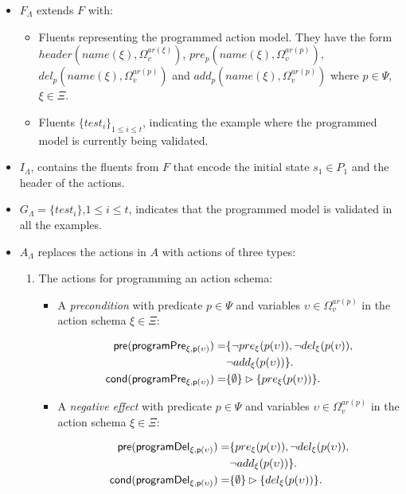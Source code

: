 \documentclass[letterpaper]{article} %
\newcommand{\pre}{\mathsf{pre}}     %
\newcommand{\cond}{\mathsf{cond}}   %
\begin{document}
\begin{itemize}
\item $F_{\Lambda}$ extends $F$ with:
\begin{itemize}
\item Fluents representing the programmed action model. They have the form $header(name(\xi),\Omega_v^{ar(\xi)})$, $pre_p(name(\xi),\Omega_v^{ar(p)})$, $del_p(name(\xi),\Omega_v^{ar(p)})$ and $add_p(name(\xi),\Omega_v^{ar(p)})$ where $p\in \Psi$, $\xi\in\Xi$.
\item Fluents $\{test_i\}_{1\leq i\leq t}$, indicating the example where the programmed model is currently being validated.
\end{itemize}
\item $I_{\Lambda}$, contains the fluents from $F$ that encode the initial state $s_1\in P_1$ and the header of the actions.
\item $G_{\Lambda}=\{test_i\}$,{\small $1\leq i\leq t$}, indicates that the programmed model is validated in all the examples.
\item $A_{\Lambda}$ replaces the actions in $A$ with actions of three types:
\begin{enumerate}
\item The actions for programming an action schema:
\begin{itemize}
\item A {\em precondition} with predicate $p\in\Psi$ and variables $\upsilon\in\Omega_v^{ar(p)}$ in the action schema $\xi\in\Xi$:
\begin{small}
\begin{align*}
\hspace*{7pt}\pre(\mathsf{programPre_{\xi,p(\upsilon)}})=&\{\neg pre_{\xi}(p(\upsilon)),\neg del_{\xi}(p(\upsilon)),\\
                                                     &\neg add_{\xi}(p(\upsilon))\}.\\                     
\cond(\mathsf{programPre_{\xi,p(\upsilon)}})=&\{\emptyset\}\rhd\{pre_{\xi}(p(\upsilon))\}.
\end{align*}
\end{small}
\item A {\em negative effect} with predicate $p\in\Psi$ and variables $\upsilon\in\Omega_v^{ar(p)}$ in the action schema $\xi\in\Xi$:
\begin{small}
\begin{align*}
\hspace*{7pt}\pre(\mathsf{programDel_{\xi,p(\upsilon)}})=&\{pre_{\xi}(p(\upsilon)),\neg del_{\xi}(p(\upsilon)),\\
                                                     &\neg add_{\xi}(p(\upsilon))\}.\\                                                   
\cond(\mathsf{programDel_{\xi,p(\upsilon)}})=&\{\emptyset\}\rhd\{del_{\xi}(p(\upsilon))\}.
\end{align*}
\end{small}


\end{itemize}
\end{enumerate}
\end{itemize}
\end{document}
